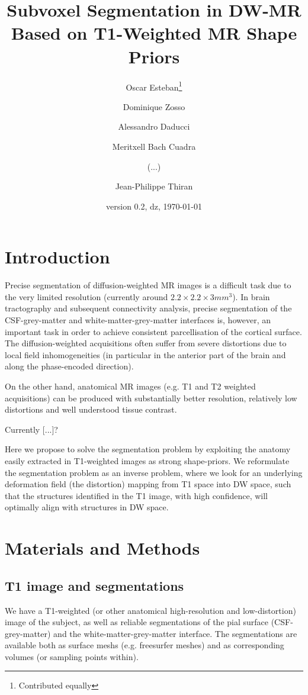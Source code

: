 \documentclass[a4paper,12pt]{article}
\title{Subvoxel Segmentation in DW-MR Based on T1-Weighted MR Shape Priors}
\author{Oscar Esteban\thanks{Contributed equally} \and Dominique Zosso\footnotemark[1] \and Alessandro Daducci \and Meritxell Bach Cuadra \and (...) \and Jean-Philippe Thiran}
\date{version 0.2, dz, \today}
\begin{document}
\maketitle


\section{Introduction}
Precise segmentation of diffusion-weighted MR images is a difficult task due to the very limited resolution (currently around $2.2\times 2.2\times 3 mm^3$). In brain tractography and subsequent connectivity analysis, precise segmentation of the CSF-grey-matter and white-matter-grey-matter interfaces is, however, an important task in order to achieve consistent parcellisation of the cortical surface. The diffusion-weighted acquisitions often suffer from severe distortions due to local field inhomogeneities (in particular in the anterior part of the brain and along the phase-encoded direction).

On the other hand, anatomical MR images (e.g. T1 and T2 weighted acquisitions) can be produced with substantially better resolution, relatively low distortions and well understood tissue contrast.

Currently [...]?

Here we propose to solve the segmentation problem by exploiting the anatomy easily extracted in T1-weighted images as strong shape-priors. We reformulate the segmentation problem as an inverse problem, where we look for an underlying deformation field (the distortion) mapping from T1 space into DW space, such that the structures identified in the T1 image, with high confidence, will optimally align with structures in DW space.

\section{Materials and Methods}

\subsection{T1 image and segmentations}
We have a T1-weighted (or other anatomical high-resolution and low-distortion) image of the subject, as well as reliable segmentations of the pial surface (CSF-grey-matter) and the white-matter-grey-matter interface. The segmentations are available both as surface meshs (e.g. freesurfer meshes) and as corresponding volumes (or sampling points within).
\end{document}

